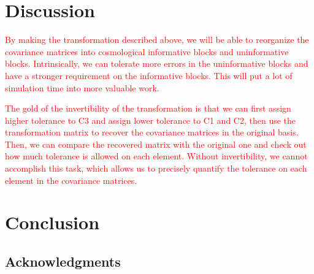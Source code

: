 \documentclass[twocolumn]{\docclass}
\begin{document}
	\section{Discussion}
	\label{sec:discussion}
	
	
	\textcolor{red}{By making the transformation described above, we will be able to reorganize the covariance matrices into cosmological informative blocks and uninformative blocks. Intrinsically, we can tolerate more errors in the uninformative blocks and have a stronger requirement on the informative blocks. This will put a lot of simulation time into more valuable work.}
	
	\textcolor{red}{The gold of the invertibility of the transformation is that we can first assign higher tolerance to C3 and assign lower tolerance to C1 and C2, then use the transformation matrix to recover the covariance matrices in the original basis. Then, we can compare the recovered matrix with the original one and check out how much tolerance is allowed on each element. Without invertibility, we cannot accomplish this task, which allows us to precisely quantify the tolerance on each element in the covariance matrices.}
	
	
	
	\section{Conclusion}
	\label{sec:conclusion}
	
	
	
	\subsection*{Acknowledgments}
	
	
	
	
\end{document}
